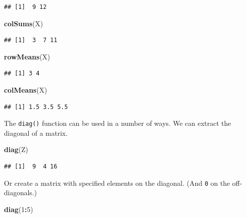 \documentclass[]{book}
\newenvironment{Shaded}{\begin{snugshade}}{\end{snugshade}}
\newcommand{\KeywordTok}[1]{\textcolor[rgb]{0.13,0.29,0.53}{\textbf{#1}}}
\newcommand{\DecValTok}[1]{\textcolor[rgb]{0.00,0.00,0.81}{#1}}
\newcommand{\OperatorTok}[1]{\textcolor[rgb]{0.81,0.36,0.00}{\textbf{#1}}}
\newcommand{\NormalTok}[1]{#1}
\theoremstyle{definition}
\theoremstyle{definition}
\theoremstyle{definition}
\theoremstyle{remark}
\begin{document}
\begin{verbatim}
## [1]  9 12
\end{verbatim}

\begin{Shaded}
\begin{Highlighting}[]
\KeywordTok{colSums}\NormalTok{(X)}
\end{Highlighting}
\end{Shaded}

\begin{verbatim}
## [1]  3  7 11
\end{verbatim}

\begin{Shaded}
\begin{Highlighting}[]
\KeywordTok{rowMeans}\NormalTok{(X)}
\end{Highlighting}
\end{Shaded}

\begin{verbatim}
## [1] 3 4
\end{verbatim}

\begin{Shaded}
\begin{Highlighting}[]
\KeywordTok{colMeans}\NormalTok{(X)}
\end{Highlighting}
\end{Shaded}

\begin{verbatim}
## [1] 1.5 3.5 5.5
\end{verbatim}

The \texttt{diag()} function can be used in a number of ways. We can
extract the diagonal of a matrix.

\begin{Shaded}
\begin{Highlighting}[]
\KeywordTok{diag}\NormalTok{(Z)}
\end{Highlighting}
\end{Shaded}

\begin{verbatim}
## [1]  9  4 16
\end{verbatim}

Or create a matrix with specified elements on the diagonal. (And
\texttt{0} on the off-diagonals.)

\begin{Shaded}
\begin{Highlighting}[]
\KeywordTok{diag}\NormalTok{(}\DecValTok{1}\OperatorTok{:}\DecValTok{5}\NormalTok{)}
\end{Highlighting}
\end{Shaded}
\end{document}
